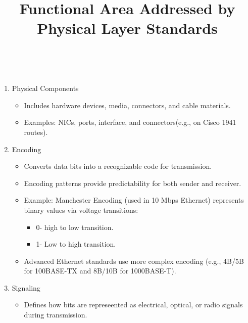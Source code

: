 \documentclass[a4paper,11pt]{article}
\begin{document}
\title{Functional Area Addressed by Physical Layer Standards}\\
\begin{enumerate}
    \item Physical Components\\
    \begin{itemize}
        \item Includes hardware devices, media, connectors, and cable materials.\\
        \item Examples: NICs, ports, interface, and connectors(e.g., on Cisco 1941 routes).\\
    \end{itemize}
    \item Encoding\\
    \begin{itemize}
        \item Converts data bits into a recognizable code for transmission.\\
        \item Encoding patterns provide predictability for both sender and receiver.\\
        \item Example: Manchester Encoding (used in 10 Mbps Ethernet) represents binary values via voltage transitions:\\
            \begin{itemize}
               \item 0-\> high to low transition.\\
               \item 1-\> Low to high transition.\\
            \end{itemize}
        \item Advanced Ethernet standards use more complex encoding (e.g., 4B/5B for 100BASE-TX and 8B/10B for 1000BASE-T).\\
    \end{itemize}
    \item Signaling\\
        \begin{itemize}
            \item Defines how bits are represeented as electrical, optical, or radio signals during transmission.\\
        \end{itemize}
\end{enumerate}
\end{document}
